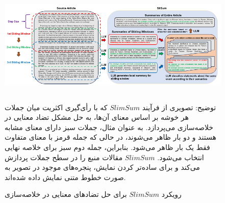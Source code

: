 \begin{figure}[!h]
	\begin{center}
		\includegraphics[height=5cm]{slimsum.png}
	\end{center}
	\caption{  رویکرد $SlimSum$ برای حل تضادهای معنایی در خلاصه‌سازی }
	\small{
		
		توضیح: تصویری از فرآیند $SlimSum$ که با رأی‌گیری اکثریت میان جملات هر خوشه بر اساس معنای آن‌ها، به حل مشکل تضاد معنایی در خلاصه‌سازی می‌پردازد. به عنوان مثال، جملات سبز دارای معنای مشابه هستند و دو بار ظاهر می‌شوند، در حالی که جمله قرمز با معنای متفاوت فقط یک بار ظاهر می‌شود. بنابراین، جمله دوم سبز برای خلاصه نهایی انتخاب می‌شود. $SlimSum$ مقالات منبع را در سطح جملات پردازش می‌کند و برای ساده‌تر کردن نمایش، پنجره‌های موجود در تصویر به صورت خطوط متنی نمایش داده شده‌اند\cite{li-etal-2024-improving-faithfulness}. }
	\label{fig:slimsum}
	
	\medskip
	
\end{figure}




